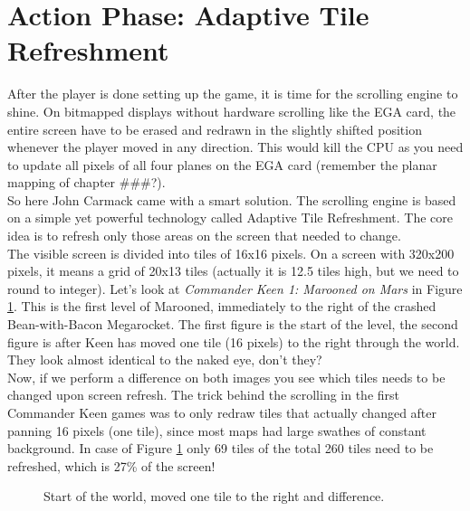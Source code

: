 \documentclass[book.tex]{subfiles}
\begin{document}
\section{Action Phase: Adaptive Tile Refreshment}
After the player is done setting up the game, it is time for the scrolling engine to shine. On bitmapped displays without hardware scrolling like the EGA card, the entire screen have to be erased and redrawn in the slightly shifted position whenever the player moved in any direction. This would kill the CPU as you need to update all pixels of all four planes on the EGA card (remember the planar mapping of chapter \#\#\#?).\\ 

So here John Carmack came with a smart solution. The scrolling engine is based on a simple yet powerful technology called Adaptive Tile Refreshment. The core idea is to  refresh only those areas on the screen that needed to change.\\

The visible screen is divided into tiles of 16x16 pixels. On a screen with 320x200 pixels, it means a grid of 20x13 tiles (actually it is 12.5 tiles high, but we need to round to integer). Let's look at \textit{Commander Keen 1: Marooned on Mars} in Figure \ref{fig:keen_difference}. This is the first level of Marooned, immediately to the right of the crashed Bean-with-Bacon Megarocket. The first figure is the start of the level, the second figure is after Keen has moved one tile (16 pixels) to the right through the world. They look almost identical to the naked eye, don't they? \\

Now, if we perform a difference on both images you see which tiles needs to be changed upon screen refresh. The trick behind the scrolling in the first Commander Keen games was to only redraw tiles that actually changed after panning 16 pixels (one tile), since most maps had large swathes of constant background. In case of Figure \ref{fig:keen_difference} only 69 tiles of the total 260 tiles need to be refreshed, which is 27\% of the screen! 


\pagebreak
\begin{figure}[H] 
  \centering 
\end{figure}
\begin{figure}[H] 
  \centering 
\end{figure}
\begin{figure}[H] 
  \centering 
  \caption{Start of the world, moved one tile to the right and difference.}
  \label{fig:keen_difference}
\end{figure}
\pagebreak
\end{document}
